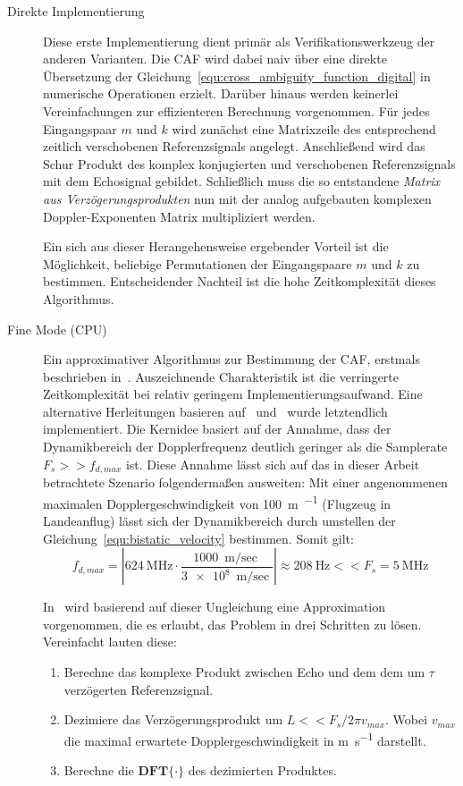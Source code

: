 \begin{description}
    \item[Direkte Implementierung]

        Diese erste Implementierung dient primär als Verifikationswerkzeug der anderen Varianten. Die CAF wird dabei naiv über eine direkte Übersetzung der Gleichung~\ref{equ:cross_ambiguity_function_digital} in numerische Operationen erzielt. Darüber hinaus werden keinerlei Vereinfachungen zur effizienteren Berechnung vorgenommen. Für jedes Eingangspaar \(m\) und \(k\) wird zunächst eine Matrixzeile des entsprechend zeitlich verschobenen Referenzsignals angelegt. Anschließend wird das Schur Produkt des komplex konjugierten und verschobenen Referenzsignals mit dem Echosignal gebildet. Schließlich muss die so entstandene \emph{Matrix aus Verzögerungsprodukten} nun mit der analog aufgebauten komplexen Doppler-Exponenten Matrix multipliziert werden.

        Ein sich aus dieser Herangehensweise ergebender Vorteil ist die Möglichkeit, beliebige Permutationen der Eingangspaare \(m\) und \(k\) zu bestimmen. Entscheidender Nachteil ist die hohe Zeitkomplexität dieses Algorithmus.
    \item[Fine Mode (CPU)]

        Ein approximativer Algorithmus zur Bestimmung der CAF, erstmals beschrieben in~\cite{Stein1981}. Auszeichnende Charakteristik ist die verringerte Zeitkomplexität bei relativ geringem Implementierungsaufwand. Eine alternative Herleitungen basieren auf~\cite{Yatrakis2001} und~\cite[S.~135--136]{Malanowski2019} wurde letztendlich implementiert. Die Kernidee basiert auf der Annahme, dass der Dynamikbereich der Dopplerfrequenz deutlich geringer als die Samplerate \(F_{s} >> f_{d,max}\) ist. Diese Annahme lässt sich auf das in dieser Arbeit betrachtete Szenario folgendermaßen ausweiten: Mit einer angenommenen maximalen Dopplergeschwindigkeit von \SI{100}{\metre\per\sec} (Flugzeug in Landeanflug) lässt sich der Dynamikbereich durch umstellen der Gleichung~\ref{equ:bistatic_velocity} bestimmen. Somit gilt: %
        \begin{equation*}
            f_{d,max} = \left| \SI{624}{\mega\hertz} \cdot \frac{\SI{1000}{\metre\per\sec}}{\SI{3e8}{\metre\per\sec}} \right| \approx \SI{208}{\hertz} << F_s = \SI{5}{\mega\hertz} %
        \end{equation*}

        In~\cite{Yatrakis2001} wird basierend auf dieser Ungleichung eine Approximation vorgenommen, die es erlaubt, das Problem in drei Schritten zu lösen. Vereinfacht lauten diese:
        \begin{enumerate}
            \item Berechne das komplexe Produkt zwischen Echo und dem dem um \(\tau \) verzögerten Referenzsignal.
            \item Dezimiere das Verzögerungsprodukt um \(L << F_s / 2 \pi v_{max} \). Wobei \(v_{max}\) die maximal erwartete Dopplergeschwindigkeit in \si{\metre\per\second} darstellt. %
            \item Berechne die \(\mathbf{DFT} {\{ \cdot \}}\) des dezimierten Produktes.
        \end{enumerate}


\end{description}
